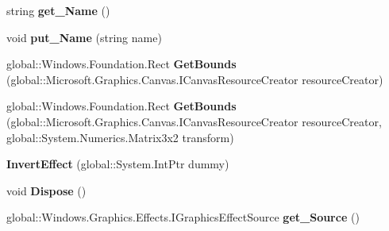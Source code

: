 \begin{DoxyCompactItemize}
\item 
\mbox{\label{class_microsoft_1_1_graphics_1_1_canvas_1_1_effects_1_1_invert_effect_a3d4fab011e089210d0ef83ae39e0f15b}} 
string {\bfseries get\+\_\+\+Name} ()
\item 
\mbox{\label{class_microsoft_1_1_graphics_1_1_canvas_1_1_effects_1_1_invert_effect_a4a1d4fe9e7b616ac0bdb5ca7ac97619d}} 
void {\bfseries put\+\_\+\+Name} (string name)
\item 
\mbox{\label{class_microsoft_1_1_graphics_1_1_canvas_1_1_effects_1_1_invert_effect_a5fc010c96cbc6ac320c75188779ef15f}} 
global\+::\+Windows.\+Foundation.\+Rect {\bfseries Get\+Bounds} (global\+::\+Microsoft.\+Graphics.\+Canvas.\+I\+Canvas\+Resource\+Creator resource\+Creator)
\item 
\mbox{\label{class_microsoft_1_1_graphics_1_1_canvas_1_1_effects_1_1_invert_effect_a74ffdb0e709635a8916e51a009e69928}} 
global\+::\+Windows.\+Foundation.\+Rect {\bfseries Get\+Bounds} (global\+::\+Microsoft.\+Graphics.\+Canvas.\+I\+Canvas\+Resource\+Creator resource\+Creator, global\+::\+System.\+Numerics.\+Matrix3x2 transform)
\item 
\mbox{\label{class_microsoft_1_1_graphics_1_1_canvas_1_1_effects_1_1_invert_effect_a22f313595335226f5fa4bd22ccbe50de}} 
{\bfseries Invert\+Effect} (global\+::\+System.\+Int\+Ptr dummy)
\item 
\mbox{\label{class_microsoft_1_1_graphics_1_1_canvas_1_1_effects_1_1_invert_effect_a4cbb66c8027cb5045b12c5081e5c3595}} 
void {\bfseries Dispose} ()
\item 
\mbox{\label{class_microsoft_1_1_graphics_1_1_canvas_1_1_effects_1_1_invert_effect_a1a48c5114100636a70cd61f22db40b37}} 
global\+::\+Windows.\+Graphics.\+Effects.\+I\+Graphics\+Effect\+Source {\bfseries get\+\_\+\+Source} ()

\end{DoxyCompactItemize}
